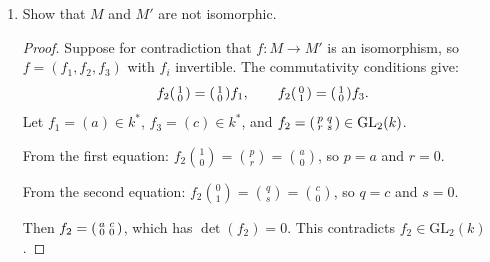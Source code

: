 \documentclass[11pt, a4paper]{article}
\begin{document}
\begin{enumerate}[leftmargin=*, label=\textbf{\arabic*.}]
\begin{enumerate}[label=(\alph*)]
\begin{proof}
    \medskip\noindent\textbf{Decomposition of $M'$.}
    Define subrepresentations
    \[
    N_1'\colon\quad k \xrightarrow{1} \operatorname{span}(e_1) \xleftarrow{1} k,
    \qquad
    N_2'\colon\quad 0 \xrightarrow{0} \operatorname{span}(e_2) \xleftarrow{0} 0.
    \]
    At each vertex: $M'(1) = k = N_1'(1) \oplus N_2'(1)$, $M'(2) = k^2 = \operatorname{span}(e_1) \oplus \operatorname{span}(e_2) = N_1'(2) \oplus N_2'(2)$, and $M'(3) = k = N_1'(3) \oplus N_2'(3)$.
    Both arrows $\binom{1}{0}\colon M'(1) \to M'(2)$ and $\binom{1}{0}\colon M'(3) \to M'(2)$ land in $\operatorname{span}(e_1) = N_1'(2)$, so the maps respect the decomposition.
    Hence $M' = N_1' \oplus N_2' \cong I(2) \oplus S(2)$, so $M'$ is not indecomposable.
    \end{proof}
    \item Show that $M$ and $M'$ are not isomorphic.
    \begin{proof}
    Suppose for contradiction that $f\colon M \to M'$ is an isomorphism, so $f = (f_1, f_2, f_3)$ with $f_i$ invertible. The commutativity conditions give:
    \[
    f_2 \begin{psmallmatrix} 1 \\ 0 \end{psmallmatrix} = \begin{psmallmatrix} 1 \\ 0 \end{psmallmatrix} f_1,
    \qquad
    f_2 \begin{psmallmatrix} 0 \\ 1 \end{psmallmatrix} = \begin{psmallmatrix} 1 \\ 0 \end{psmallmatrix} f_3.
    \]
    Let $f_1 = (a) \in k^*$, $f_3 = (c) \in k^*$, and $f_2 = \begin{psmallmatrix} p & q \\ r & s \end{psmallmatrix} \in \mathrm{GL}_2(k)$.

    From the first equation: $f_2 \binom{1}{0} = \binom{p}{r} = \binom{a}{0}$, so $p = a$ and $r = 0$.

    From the second equation: $f_2 \binom{0}{1} = \binom{q}{s} = \binom{c}{0}$, so $q = c$ and $s = 0$.

    Then $f_2 = \begin{psmallmatrix} a & c \\ 0 & 0 \end{psmallmatrix}$, which has $\det(f_2) = 0$. This contradicts $f_2 \in \mathrm{GL}_2(k)$.


\end{proof}
\end{enumerate}
\end{enumerate}
\end{document}
